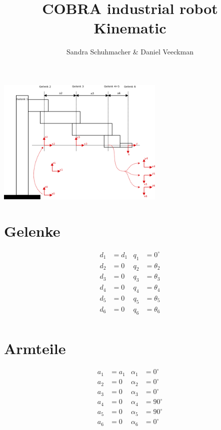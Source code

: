\documentclass[12pt]{article}
\begin{document}
 
 
\title{COBRA industrial robot Kinematic}%
\author{Sandra Schuhmacher \& Daniel Veeckman} %
 
\maketitle

\includegraphics[width=0.6\textwidth]{Kinematic.png}
 
\section{Gelenke}

\begin{align*}
    d_1 &= d_1 & q_1 &= 0^\circ \\
    d_2 &= 0   & q_2 &= \theta_2 \\
    d_3 &= 0   & q_3 &= \theta_3 \\
    d_4 &= 0   & q_4 &= \theta_4 \\
    d_5 &= 0   & q_5 &= \theta_5 \\
    d_6 &= 0   & q_6 &= \theta_6 \\
\end{align*}
 
\section{Armteile}

\begin{align*}
    a_1 &= a_1 & \alpha_1 &= 0^\circ \\
    a_2 &= 0   & \alpha_2 &= 0^\circ \\
    a_3 &= 0   & \alpha_3 &= 0^\circ \\
    a_4 &= 0   & \alpha_4 &= 90^\circ \\
    a_5 &= 0   & \alpha_5 &= 90^\circ \\
    a_6 &= 0   & \alpha_6 &= 0^\circ \\
\end{align*}
 
\end{document}
